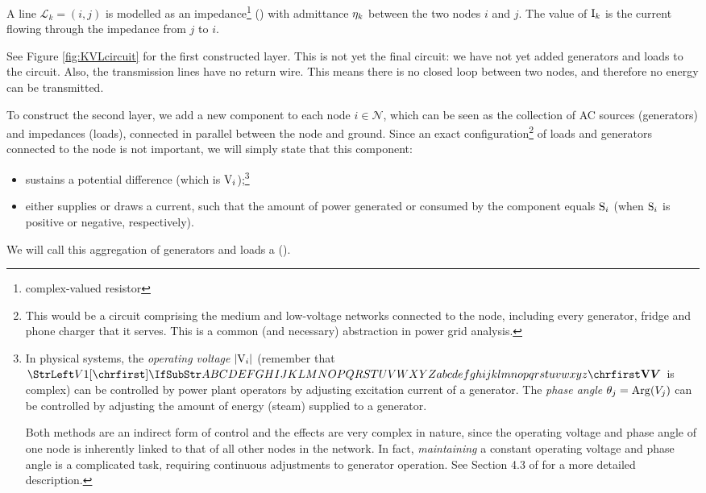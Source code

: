 \documentclass[main.tex]{subfiles}
\begin{document}
A line $\mathcal{L}_k=(i,j)$ is modelled as an impedance\footnote{complex-valued resistor} (\inlineres) with admittance ${\mathrm{\eta}}_k$ between the two nodes $i$ and $j$. The value of ${\mathrm{I}}_k$ is the current flowing through the impedance from $j$ to $i$.

See Figure \ref{fig:KVLcircuit} for the first constructed layer. This is not yet the final circuit: we have not yet added generators and loads to the circuit. Also, the transmission lines have no return wire. This means there is no closed loop between two nodes, and therefore no energy can be transmitted.


To construct the second layer, we add a new component to each node $i \in \mathcal{N}$, which can be seen as the collection of AC sources (generators) and impedances (loads), connected in parallel between the node and ground. Since an exact configuration\footnote{This would be a circuit comprising the medium and low-voltage networks connected to the node, including every generator, fridge and phone charger that it serves. This is a common (and necessary) abstraction in power grid analysis.} of loads and generators connected to the node is not important, we will simply state that this component:
\begin{itemize}
    \item sustains a potential difference (which is ${\mathrm{V}}_i$);\footnote{In physical systems, the \emph{operating voltage} $|{\mathrm{V}}_i|$ (remember that $\mat{V}$ is complex) can be controlled by power plant operators by adjusting excitation current of a generator. The \emph{phase angle} $\theta_j=\operatorname{Arg}(V_j)$ can be controlled by adjusting the amount of energy (steam) supplied to a generator.
    
    Both methods are an indirect form of control and the effects are very complex in nature, since the operating voltage and phase angle of one node is inherently linked to that of all other nodes in the network. In fact, \emph{maintaining} a constant operating voltage and phase angle is a complicated task, requiring continuous adjustments to generator operation. See Section 4.3 of \cite{VonMeier2006} for a more detailed description.}
    \item either supplies or draws a current, such that the amount of power generated or consumed by the component equals ${\mathrm{S}}_i$ (when ${\mathrm{S}}_i$ is positive or negative, respectively).
\end{itemize}
We will call this aggregation of generators and loads a  (\inlineac).
\end{document}
